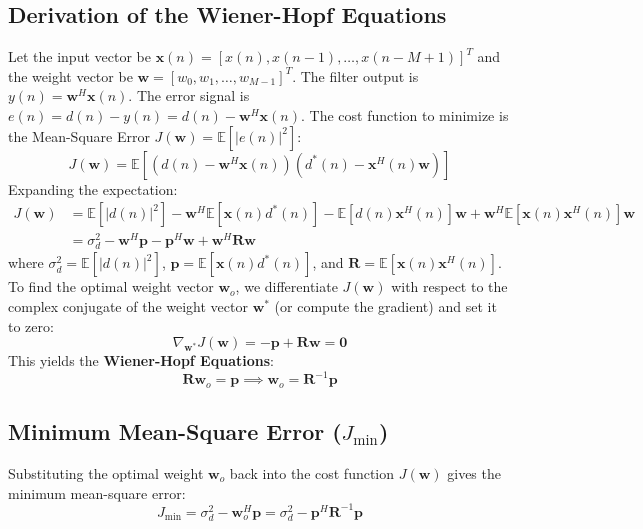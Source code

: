 \documentclass[12pt,a4paper]{article}
\begin{document}
\subsection{Derivation of the Wiener-Hopf Equations}
Let the input vector be $\mathbf{x}(n) = [x(n), x(n-1), \dots, x(n-M+1)]^T$ and the weight vector be $\mathbf{w} = [w_0, w_1, \dots, w_{M-1}]^T$. The filter output is $y(n) = \mathbf{w}^H \mathbf{x}(n)$. The error signal is $e(n) = d(n) - y(n) = d(n) - \mathbf{w}^H \mathbf{x}(n)$.
The cost function to minimize is the Mean-Square Error $J(\mathbf{w}) = \mathbb{E}[|e(n)|^2]$:
\begin{equation}
  J(\mathbf{w}) = \mathbb{E}\left[(d(n) - \mathbf{w}^H \mathbf{x}(n))(d^*(n) - \mathbf{x}^H(n) \mathbf{w})\right]
\end{equation}
Expanding the expectation:
\begin{align}
  J(\mathbf{w}) &= \mathbb{E}[|d(n)|^2] - \mathbf{w}^H \mathbb{E}[\mathbf{x}(n) d^*(n)] - \mathbb{E}[d(n) \mathbf{x}^H(n)] \mathbf{w} + \mathbf{w}^H \mathbb{E}[\mathbf{x}(n) \mathbf{x}^H(n)] \mathbf{w} \nonumber \\
  &= \sigma_d^2 - \mathbf{w}^H \mathbf{p} - \mathbf{p}^H \mathbf{w} + \mathbf{w}^H \mathbf{R} \mathbf{w}
\end{align}
where $\sigma_d^2 = \mathbb{E}[|d(n)|^2]$, $\mathbf{p} = \mathbb{E}[\mathbf{x}(n) d^*(n)]$, and $\mathbf{R} = \mathbb{E}[\mathbf{x}(n) \mathbf{x}^H(n)]$.
To find the optimal weight vector $\mathbf{w}_o$, we differentiate $J(\mathbf{w})$ with respect to the complex conjugate of the weight vector $\mathbf{w}^*$ (or compute the gradient) and set it to zero:
\begin{equation}
  \nabla_{\mathbf{w}^*} J(\mathbf{w}) = -\mathbf{p} + \mathbf{R} \mathbf{w} = \mathbf{0}
\end{equation}
This yields the \textbf{Wiener-Hopf Equations}:
\begin{equation}
  \mathbf{R} \mathbf{w}_o = \mathbf{p} \implies \mathbf{w}_o = \mathbf{R}^{-1} \mathbf{p}
\end{equation}

\subsection{Minimum Mean-Square Error (\texorpdfstring{$J_{\text{min}}$}{Jmin})}
Substituting the optimal weight $\mathbf{w}_o$ back into the cost function $J(\mathbf{w})$ gives the minimum mean-square error:
\begin{equation}
  J_{\text{min}} = \sigma_d^2 - \mathbf{w}_o^H \mathbf{p} = \sigma_d^2 - \mathbf{p}^H \mathbf{R}^{-1} \mathbf{p}
\end{equation}
\end{document}
